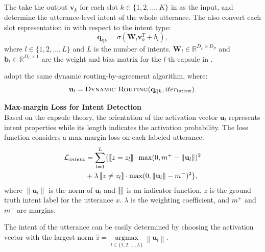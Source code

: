\subsection{\ThirdCapsule}
The {\ThirdCapsule} take the output $\mathbf{v}_k$ for each slot $k \in \{1,2,...,K\}$ in {\SecondCapsule} as the input, and determine the utterance-level intent of the whole utterance.
The {\ThirdCapsule} also convert each slot representation in {\SecondCapsule} with respect to the intent type:
\begin{equation}
\mathbf{q}_{l|k} = \sigma(\mathbf{W}_{l}\mathbf{v}_k^T +b_{l}),
\end{equation}
where $l \in \{1,2,...,L\}$ and $L$ is the number of intents. $\mathbf{W}_l \in \mathbb{R}^{D_L\times D_P}$ and $\mathbf{b}_l \in \mathbb{R}^{D_L\times 1}$ are the weight and bias matrix for the $l$-th capsule in {\ThirdCapsule}.

{\ThirdCapsule} adopt the same dynamic routing-by-agreement algorithm, where:
\begin{equation}
\mathbf{u}_l = \textsc{Dynamic Routing}(\mathbf{q}_{l|k}, iter_{\operatorname{intent}}).
\end{equation}

\noindent\textbf{Max-margin Loss for Intent Detection}\\
Based on the capsule theory, the orientation of the activation vector $\mathbf{u}_l$ represents intent properties while its length indicates the activation probability. 
The loss function considers a max-margin loss on each labeled utterance:
\begin{align}\label{eq:loss}
\begin{split}
\mathcal{L}_{intent}&= \sum_{l=1}^{L}\{
\left[\kern-0.15em\left[ {{z} = z_l} \right]\kern-0.15em\right]\cdot \max (0,m^ +  - {{\left\| {{\mathbf{u}_l}} \right\|}})^2\\
&+ \lambda \left[\kern-0.15em\left[ {{z} \ne z_l} \right]\kern-0.15em\right]\cdot \max (0,{{\left\| {{\mathbf{u}_l}} \right\|}} - m^ - )^2\},\\
\end{split}
\end{align}
where $\|\mathbf{u}_l\|$ is the norm of $\mathbf{u}_l$ and $\left[\kern-0.15em\left[  \right]\kern-0.15em\right]$ is an indicator function, $z$ is the ground truth intent label for the utterance $x$. $\lambda$ is the weighting coefficient, and $m^ +$ and $m^ -$ are margins.

The intent of the utterance can be easily determined by choosing the activation vector with the largest norm ${{\hat z}} = \mathop {\arg \max }\limits_{l \in \{ 1,2,...,L\} } \left\| {{{\mathbf{u}}_l}} \right\|$.

